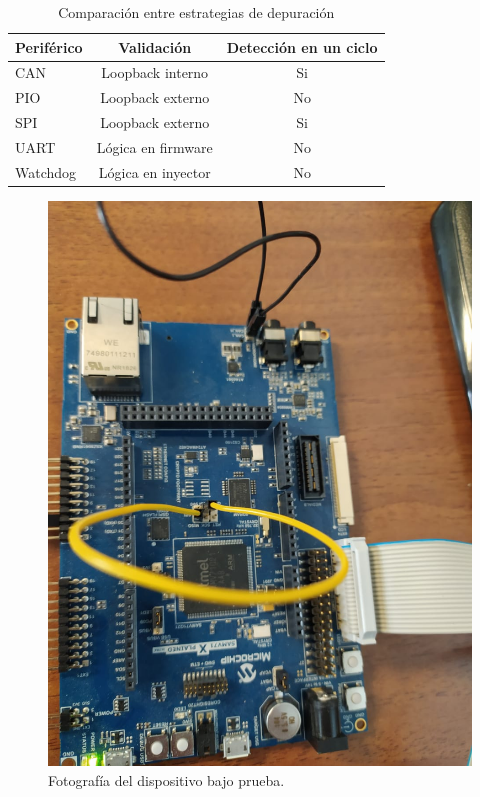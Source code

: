 \begin{table}[h]
	\centering
	\caption[Estrategias de depuración]{Comparación entre estrategias de depuración}

	\begin{tabular}{l c c}    
		\toprule
        \textbf{Periférico} & \textbf{Validación}       & \textbf{Detección en un ciclo}\\
		\midrule
		CAN                 & Loopback interno          & Si\\		
		PIO                 & Loopback externo          & No\\
		SPI                 & Loopback externo          & Si\\
		UART                & Lógica en firmware        & No\\
		Watchdog            & Lógica en inyector        & No\\
		\bottomrule
		\hline
	\end{tabular}
	\label{tab:perifericos}
\end{table}

\begin{figure}[htbp]
	\centering
	\includegraphics[width=\textwidth]{./Figures/labo.jpeg}
    \caption{Fotografía del dispositivo bajo prueba.}
	\label{fig:labo}
\end{figure}


